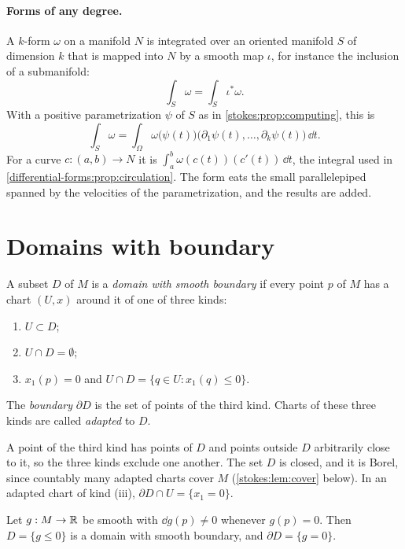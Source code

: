 \begin{notechapter}
\paragraph{Forms of any degree.} A $k$-form $\omega$ on a manifold $N$
is integrated over an oriented manifold $S$ of dimension $k$ that is
mapped into $N$ by a smooth map $\iota$, for instance the inclusion of
a submanifold:
\[
  \int_S\omega = \int_S\iota^*\omega .
\]
With a positive parametrization $\psi$ of $S$ as in
\cref{stokes:prop:computing}, this is
\[
  \int_S\omega = \int_\Omega\omega\bigl(\psi(t)\bigr)
  \bigl(\partial_1\psi(t),\dots,\partial_k\psi(t)\bigr)\,\dd t .
\]
For a curve $c:(a, b)\to N$ it is
$\int_a^b\omega(c(t))(c'(t))\,\dd t$, the integral used in
\cref{differential-forms:prop:circulation}. The form eats the small
parallelepiped spanned by the velocities of the parametrization, and
the results are added.

\section{Domains with boundary}\label{stokes:sec:boundary}

\begin{definition}\label{stokes:def:domain}
A subset $D$ of $M$ is a \emph{domain with smooth boundary} if every
point $p$ of $M$ has a chart $(U, x)$ around it of one of three kinds:
\begin{enumerate}[nosep,label=(\roman*)]
  \item $U\subset D$;
  \item $U\cap D = \emptyset$;
  \item $x_1(p) = 0$ and $U\cap D = \{q\in U : x_1(q)\leq0\}$.
\end{enumerate}
The \emph{boundary} $\partial D$ is the set of points of the third
kind. Charts of these three kinds are called \emph{adapted} to $D$.
\end{definition}

A point of the third kind has points of $D$ and points outside $D$
arbitrarily close to it, so the three kinds exclude one another. The
set $D$ is closed, and it is Borel, since countably many adapted charts
cover $M$ (\cref{stokes:lem:cover} below). In an adapted chart of kind
(iii), $\partial D\cap U = \{x_1 = 0\}$.

\begin{proposition}\label{stokes:prop:sublevel}
Let $g:M\to\mathbb{R}$ be smooth with $\dd g(p)\neq0$ whenever $g(p) = 0$. Then
$D = \{g\leq0\}$ is a domain with smooth boundary, and
$\partial D = \{g = 0\}$.
\end{proposition}


\end{notechapter}
